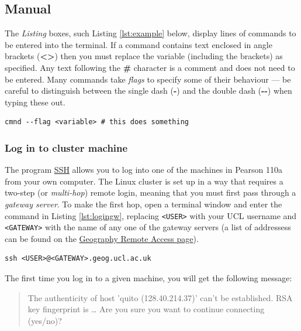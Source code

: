 \documentclass[a4paper]{article}
\begin{document}
\subsection{Manual}
\label{sec:manual}

The \emph{Listing} boxes, such Listing \ref{lst:example} below, display lines of commands to be entered into the terminal.
If a command contains text enclosed in angle brackets (\textbf{\textless{}\textgreater{}}) then you must replace the variable (including the brackets) as specified.
Any text following the \textbf{\#} character is a comment and does not need to be entered.
Many commands take \emph{flags} to specify some of their behaviour --- be careful to distinguish between the single dash (\textbf{-}) and the double dash (\textbf{-{}-}) when typing these out.
\begin{lstlisting}[caption={An example of a command}, label={lst:example}]
cmnd --flag <variable> # this does something
\end{lstlisting}

\subsubsection{Log in to cluster machine}
\label{sec:login}
The program \href{http://linuxcommand.org/man_pages/ssh1.html}{SSH} allows you to log into one of the machines in Pearson 110a from your own computer.
The Linux cluster is set up in a way that requires a two-step (or \emph{multi-hop}) remote login, meaning that you must first pass through a \emph{gateway server}. 
To make the first hop, open a terminal window and enter the command in Listing \ref{lst:logingw}, replacing \texttt{\textless{}USER\textgreater{}} with your UCL username and \texttt{\textless{}GATEWAY\textgreater{}} with the name of any one of the gateway servers (a list of addressess can be found on the \href{http://www.geog.ucl.ac.uk/resources/computer-support/linux-remote-access}{Geography Remote Access page}).

\begin{lstlisting}[caption={Login to gateway}, label={lst:logingw}]
ssh <USER>@<GATEWAY>.geog.ucl.ac.uk
\end{lstlisting}

The first time you log in to a given machine, you will get the following message:

\begin{quote}
The authenticity of host 'quito (128.40.214.37)' can't be established.
RSA key fingerprint is \ldots{} 
Are you sure you want to continue connecting (yes/no)?
\end{quote}
\end{document}
